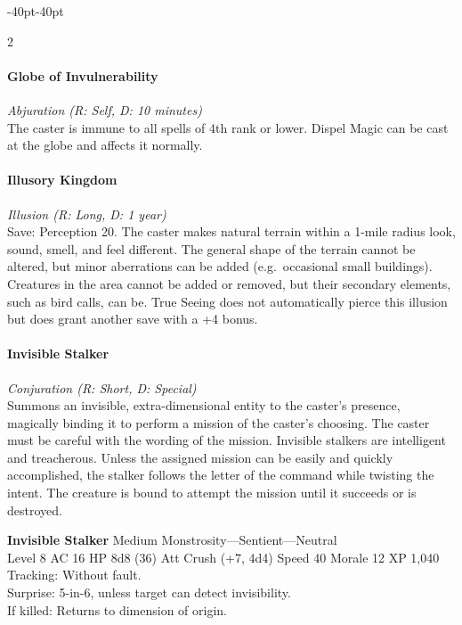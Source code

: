 \documentclass{book}
\begin{document}
\begin{adjustwidth}{-40pt}{-40pt}
\begin{multicols}{2}
\paragraph{Globe of Invulnerability}\label{globe-of-invulnerability}

\emph{Abjuration (R: Self, D: 10 minutes)}\\
The caster is immune to all spells of 4th rank or lower. Dispel Magic
can be cast at the globe and affects it normally.

\paragraph{Illusory Kingdom}\label{illusory-kingdom}

\emph{Illusion (R: Long, D: 1 year)}\\
Save: Perception 20. The caster makes natural terrain within a 1-mile
radius look, sound, smell, and feel different. The general shape of the
terrain cannot be altered, but minor aberrations can be added
(e.g.~occasional small buildings). Creatures in the area cannot be added
or removed, but their secondary elements, such as bird calls, can be.
True Seeing does not automatically pierce this illusion but does grant
another save with a +4 bonus.

\paragraph{Invisible Stalker}\label{invisible-stalker}

\emph{Conjuration (R: Short, D: Special)}\\
Summons an invisible, extra-dimensional entity to the caster's presence,
magically binding it to perform a mission of the caster's choosing. The
caster must be careful with the wording of the mission. Invisible
stalkers are intelligent and treacherous. Unless the assigned mission
can be easily and quickly accomplished, the stalker follows the letter
of the command while twisting the intent. The creature is bound to
attempt the mission until it succeeds or is destroyed.

\textbf{Invisible Stalker} Medium Monstrosity---Sentient---Neutral\\
Level 8 AC 16 HP 8d8 (36) Att Crush (+7, 4d4) Speed 40 Morale 12 XP
1,040\\
Tracking: Without fault.\\
Surprise: 5-in-6, unless target can detect invisibility.\\
If killed: Returns to dimension of origin.


\end{multicols}
\end{adjustwidth}
\end{document}
